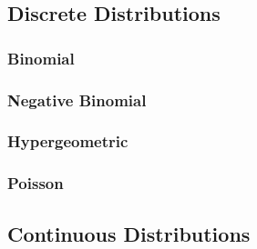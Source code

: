 \subsection{Discrete Distributions}
\subsubsection{Binomial}
\subsubsection{Negative Binomial}
\subsubsection{Hypergeometric}
\subsubsection{Poisson}
\subsection{Continuous Distributions}
